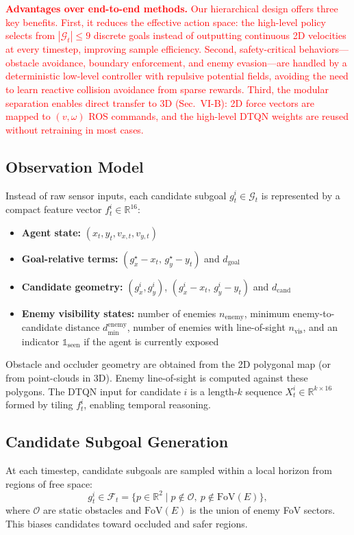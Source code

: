 \documentclass[letterpaper, 10 pt, conference]{ieeeconf}
\begin{document}
\textcolor{red}{\textbf{Advantages over end-to-end methods.} Our hierarchical design offers three key benefits. First, it reduces the effective action space: the high-level policy selects from $|\mathcal{G}_t| \leq 9$ discrete goals instead of outputting continuous 2D velocities at every timestep, improving sample efficiency. Second, safety-critical behaviors—obstacle avoidance, boundary enforcement, and enemy evasion—are handled by a deterministic low-level controller with repulsive potential fields, avoiding the need to learn reactive collision avoidance from sparse rewards. Third, the modular separation enables direct transfer to 3D (Sec.~VI-B): 2D force vectors are mapped to $(v, \omega)$ ROS commands, and the high-level DTQN weights are reused without retraining in most cases.}

\subsection{Observation Model}
Instead of raw sensor inputs, each candidate subgoal $g_t^i \in \mathcal{G}_t$ is represented by a compact feature vector $f_t^i \in \mathbb{R}^{16}$:
\begin{itemize}
    \item \textbf{Agent state:} $(x_t, y_t, v_{x,t}, v_{y,t})$
    \item \textbf{Goal-relative terms:} $(g^\star_x - x_t,\, g^\star_y - y_t)$ and $d_{\text{goal}}$
    \item \textbf{Candidate geometry:} $(g^i_x, g^i_y)$, $(g^i_x - x_t,\, g^i_y - y_t)$ and $d_{\text{cand}}$
    \item \textbf{Enemy visibility states:} number of enemies $n_{\text{enemy}}$, minimum enemy-to-candidate distance $d_{\min}^{\text{enemy}}$, number of enemies with line-of-sight $n_{\text{vis}}$, and an indicator $\mathbb{1}_{\text{seen}}$ if the agent is currently exposed
\end{itemize}
Obstacle and occluder geometry are obtained from the 2D polygonal map (or from point-clouds in 3D). Enemy line-of-sight is computed against these polygons. The DTQN input for candidate $i$ is a length-$k$ sequence $X_t^i \in \mathbb{R}^{k \times 16}$ formed by tiling $f_t^i$, enabling temporal reasoning.

\subsection{Candidate Subgoal Generation}
At each timestep, candidate subgoals are sampled within a local horizon from regions of free space:
\begin{equation}
g_t^i \in \mathcal{F}_t = \{p \in \mathbb{R}^2 \mid p \notin \mathcal{O},~p \notin \text{FoV}(E)\},
\end{equation}
where $\mathcal{O}$ are static obstacles and $\text{FoV}(E)$ is the union of enemy FoV sectors. This biases candidates toward occluded and safer regions.
\end{document}
